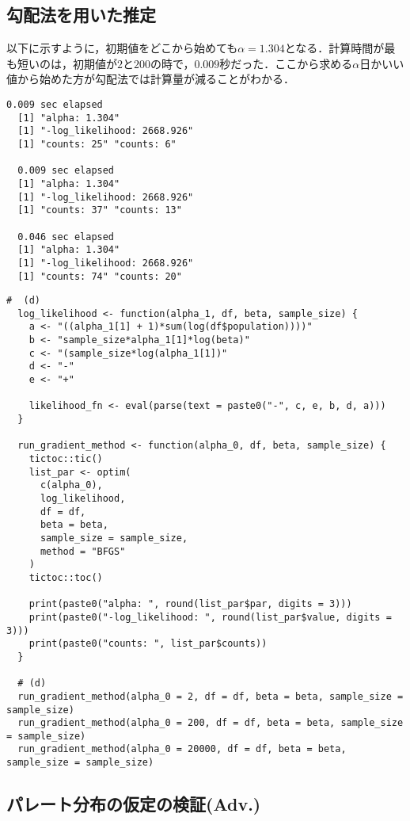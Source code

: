 \documentclass{article}
\begin{document}
\subsection{勾配法を用いた推定}

以下に示すように，初期値をどこから始めても$\alpha = 1.304$となる．計算時間が最も短いのは，初期値が$2$と$200$の時で，$0.009$秒だった．ここから求める$\alpha$日かいい値から始めた方が勾配法では計算量が減ることがわかる．

\begin{lstlisting}[caption=勾配法を用いた推定,label=d]
  0.009 sec elapsed
  [1] "alpha: 1.304"
  [1] "-log_likelihood: 2668.926"
  [1] "counts: 25" "counts: 6"

  0.009 sec elapsed
  [1] "alpha: 1.304"
  [1] "-log_likelihood: 2668.926"
  [1] "counts: 37" "counts: 13"

  0.046 sec elapsed
  [1] "alpha: 1.304"
  [1] "-log_likelihood: 2668.926"
  [1] "counts: 74" "counts: 20"
\end{lstlisting}

\begin{lstlisting}[caption=コード,label=e]
  #  (d)
  log_likelihood <- function(alpha_1, df, beta, sample_size) {
    a <- "((alpha_1[1] + 1)*sum(log(df$population))))"
    b <- "sample_size*alpha_1[1]*log(beta)"
    c <- "(sample_size*log(alpha_1[1])"
    d <- "-"
    e <- "+"

    likelihood_fn <- eval(parse(text = paste0("-", c, e, b, d, a)))
  }

  run_gradient_method <- function(alpha_0, df, beta, sample_size) {
    tictoc::tic()
    list_par <- optim(
      c(alpha_0),
      log_likelihood,
      df = df,
      beta = beta,
      sample_size = sample_size,
      method = "BFGS"
    )
    tictoc::toc()

    print(paste0("alpha: ", round(list_par$par, digits = 3)))
    print(paste0("-log_likelihood: ", round(list_par$value, digits = 3)))
    print(paste0("counts: ", list_par$counts))
  }

  # (d)
  run_gradient_method(alpha_0 = 2, df = df, beta = beta, sample_size = sample_size)
  run_gradient_method(alpha_0 = 200, df = df, beta = beta, sample_size = sample_size)
  run_gradient_method(alpha_0 = 20000, df = df, beta = beta, sample_size = sample_size)
\end{lstlisting}


\subsection{パレート分布の仮定の検証(Adv.)}
\end{document}
